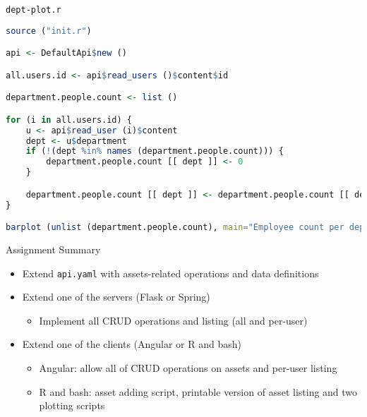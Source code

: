 \begin{frame}[fragile]{\lstinline{dept-plot.r}}
\begin{lstlisting}[language=r,style=mini]
source ("init.r")

api <- DefaultApi$new ()

all.users.id <- api$read_users ()$content$id

department.people.count <- list ()

for (i in all.users.id) {
    u <- api$read_user (i)$content
    dept <- u$department
    if (!(dept %in% names (department.people.count))) {
        department.people.count [[ dept ]] <- 0
    }

    department.people.count [[ dept ]] <- department.people.count [[ dept ]] + 1
}

barplot (unlist (department.people.count), main="Employee count per department")
\end{lstlisting}
\end{frame}




\begin{frame}{Assignment Summary}
    \begin{itemize}
        \item Extend \lstinline{api.yaml} with assets-related operations and data definitions
        \item Extend one of the servers (Flask or Spring)
            \begin{itemize}
                \item Implement all CRUD operations and listing (all and per-user)
            \end{itemize}
        \item Extend one of the clients (Angular or R and bash)
            \begin{itemize}
                \item Angular: allow all of CRUD operations on assets and per-user listing
                \item R and bash: asset adding script, printable version of asset listing and two plotting scripts
            \end{itemize}
    \end{itemize}
\end{frame}
